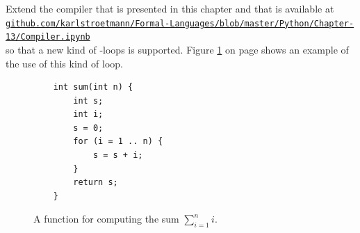 \pagebreak
\vspace*{\fill}

\pagebreak
\vspace*{\fill}

\pagebreak


\exerciseEng
Extend the compiler that is presented in this chapter and that is available at
\\[0.2cm]
\hspace*{0.3cm}
\href{https://github.com/karlstroetmann/Formal-Languages/blob/master/Python/Chapter-13/Compiler.ipynb}{\scriptsize\texttt{github.com/karlstroetmann/Formal-Languages/blob/master/Python/Chapter-13/Compiler.ipynb}}
\\[0.2cm]
so that a new kind of -loops is supported.
Figure \ref{fig:MySum.c3} on page \pageref{fig:MySum.c3} shows an example of the use of this kind of
 loop. 
\eox

\begin{figure}[!ht]
\centering
\begin{verbatim}
    int sum(int n) {
        int s;
        int i;
        s = 0;
        for (i = 1 .. n) {
            s = s + i;
        }
        return s;
    }
\end{verbatim}
\vspace*{-0.3cm}
\caption{A function for computing the sum $\sum\limits_{i=1}^{n}i$.}
\label{fig:MySum.c3}
\end{figure}

